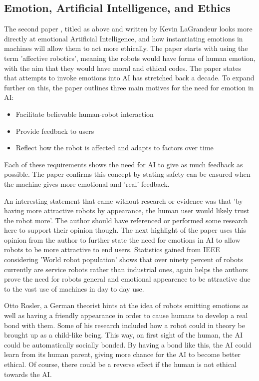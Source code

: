 \documentclass[article]{IEEEtran}
\begin{document}
\subsection{Emotion, Artificial Intelligence, and Ethics}
The second paper \cite{ethicsEmotion}, titled as above and written by Kevin LaGrandeur looks more directly at emotional Artificial Intelligence, and how instantiating emotions in machines will allow them to act more ethically. The paper starts with using the term 'affective robotics', meaning the robots would have forms of human emotion, with the aim that they would have moral and ethical codes. The paper states that attempts to invoke emotions into AI has stretched back a decade.
To expand further on this, the paper outlines three main motives for the need for emotion in AI:
\begin{itemize}
\item Facilitate believable human-robot interaction
\item Provide feedback to users
\item Reflect how the robot is affected and adapts to factors over time
\end{itemize}
Each of these requirements shows the need for AI to give as much feedback as possible. The paper confirms this concept by stating safety can be ensured when the machine gives more emotional and 'real' feedback. \par
An interesting statement that came without research or evidence was that 'by having more attractive robots by appearance, the human user would likely trust the robot more'. The author should have referenced or performed some research here to support their opinion though. The next highlight of the paper uses this opinion from the author to further state the need for emotions in AI to allow robots to be more attractive to end users. Statistics gained from IEEE \cite{ieeRobotsStats} considering 'World robot population' shows that over ninety percent of robots currently are service robots rather than industrial ones, again helps the authors prove the need for robots general and emotional appearence to be attractive due to the vast use of machines in day to day use. \par
Otto Rosler, a German theorist hints at the idea of robots emitting emotions as well as having a friendly appearance in order to cause humans to develop a real bond with them. Some of his research included how a robot could in theory be brought up as a child-like being. This way, on first sight of the human, the AI could be automatically socially bonded. By having a bond like this, the AI could learn from its human parent, giving more chance for the AI to become better ethical. Of course, there could be a reverse effect if the human is not ethical towards the AI. \par
\end{document}
